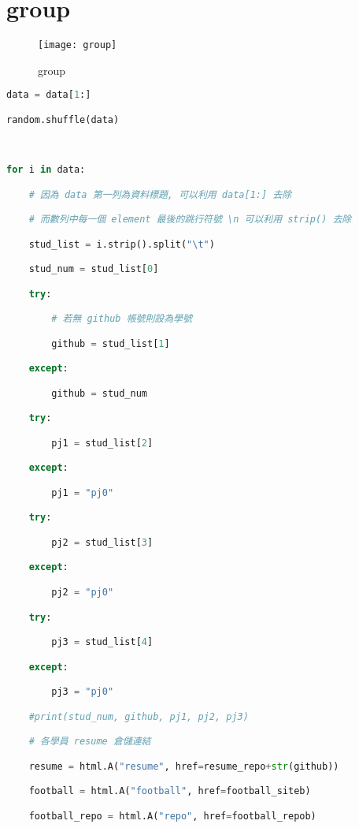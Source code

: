 \chapter{group}

\begin{figure}[hbt!]
\begin{center}
\texttt{[image: group]}
\caption{\Large group}\label{group}
\end{center}
\end{figure}
\usepackage{listings}
\begin{lstlisting}[language=Python]
 data = data[1:] 

random.shuffle(data) 

 

for i in data: 

    # 因為 data 第一列為資料標題, 可以利用 data[1:] 去除 

    # 而數列中每一個 element 最後的跳行符號 \n 可以利用 strip() 去除 

    stud_list = i.strip().split("\t") 

    stud_num = stud_list[0] 

    try: 

        # 若無 github 帳號則設為學號 

        github = stud_list[1] 

    except: 

        github = stud_num 

    try: 

        pj1 = stud_list[2] 

    except: 

        pj1 = "pj0" 

    try: 

        pj2 = stud_list[3] 

    except: 

        pj2 = "pj0" 

    try: 

        pj3 = stud_list[4] 

    except: 

        pj3 = "pj0" 

    #print(stud_num, github, pj1, pj2, pj3) 

    # 各學員 resume 倉儲連結 

    resume = html.A("resume", href=resume_repo+str(github)) 

    football = html.A("football", href=football_siteb) 

    football_repo = html.A("repo", href=football_repob) 


\end{lstlisting}
